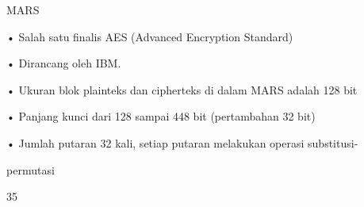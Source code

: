 \documentclass{article}
\begin{document}

MARS

• Salah satu finalis AES (Advanced Encryption Standard)

• Dirancang oleh IBM.

• Ukuran blok plainteks dan cipherteks di dalam MARS adalah 128 bit

• Panjang kunci dari 128 sampai 448 bit (pertambahan 32 bit)

• Jumlah putaran 32 kali, setiap putaran melakukan operasi substitusi-

permutasi

35
\end{document}
